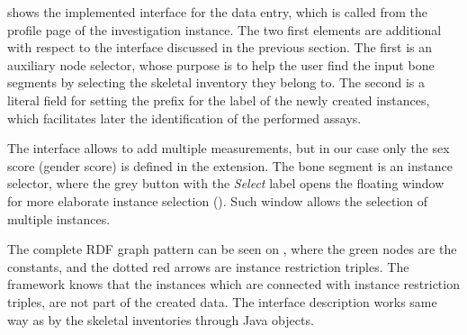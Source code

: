  shows the implemented interface for the data entry, which is called from the profile page of the investigation instance. The two first elements are additional with respect to the interface discussed in the previous section. The first is an auxiliary node selector, whose purpose is to help the user find the input bone segments by selecting the skeletal inventory they belong to. The second is a literal field for setting the prefix for the label of the newly created instances, which facilitates later the identification of the performed assays.


The interface allows to add multiple measurements, but in our case only the sex score (gender score) is defined in the extension. The bone segment is an instance selector, where the grey button with the \textit{Select} label opens the floating window for more elaborate instance selection (). Such window allows the selection of multiple instances.


The complete RDF graph pattern can be seen on , where the green nodes are the constants, and the dotted red arrows are instance restriction triples. The framework knows that the instances which are connected with instance restriction triples, are not part of the created data. The interface description works same way as by the skeletal inventories through Java objects.




